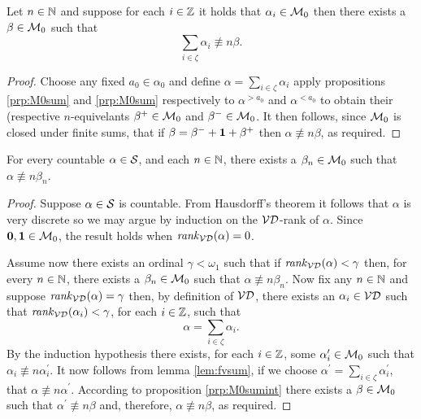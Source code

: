 \begin{prp}\label{prp:M0sumint}
	Let $n\in\mathbb{N}$ and suppose for each $i\in\mathbb{Z}$ it holds that $\alpha_i\in\mathcal{M}_0$ then there exists a $\beta\in\mathcal{M}_0$ such that
	\begin{equation}
		\sum_{i\in\zeta}\alpha_i\nequiv{n}\beta.
	\end{equation}
\end{prp}
\begin{proof}
	Choose any fixed $a_0\in\alpha_0$ and define $\alpha=\sum_{i\in\zeta}\alpha_i$ apply propositions \ref{prp:M0sum} and \ref{prp:M0sum} respectively to $\alpha^{>a_0}$ and $\alpha^{<a_0}$ to obtain their (respective $n$-equivelants $\beta^+\in\mathcal{M}_0$ and $\beta^-\in\mathcal{M}_0$.  It then follows, since $\mathcal{M}_0$ is closed under finite sums, that if $\beta=\beta^-+\mathbf{1}+\beta^+$ then $\alpha\nequiv{n}\beta$, as required.
\end{proof}

\begin{thm}
	For every countable $\alpha\in\mathcal{S}$, and each $n\in\mathbb{N}$, there exists a $\beta_n\in\mathcal{M}_0$ such that $\alpha\nequiv{n}\beta_n$.
\end{thm}
\begin{proof}
	Suppose $\alpha\in\mathcal{S}$ is countable.  From Hausdorff's theorem it follows that $\alpha$ is very discrete so we may argue by induction on the $\mathcal{VD}$-rank of $\alpha$. Since $\mathbf{0},\mathbf{1}\in\mathcal{M}_0$, the result holds when $\mathit{rank}_\mathcal{VD}(\alpha)=0$.

	Assume now there exists an ordinal $\gamma<\omega_1$ such that if $\mathit{rank}_\mathcal{VD}(\alpha)<\gamma$ then, for every $n\in\mathbb{N}$, there exists a $\beta_n\in\mathcal{M}_0$ such that $\alpha\nequiv{n}\beta_n$.  Now fix any $n\in\mathbb{N}$ and  suppose $\mathit{rank}_\mathcal{VD}(\alpha)=\gamma$ then, by definition of $\mathcal{VD}$, there exists an $\alpha_i\in\mathcal{VD}$ such that $\mathit{rank}_\mathcal{VD}(\alpha_i)<\gamma$, for each $i\in\mathbb{Z}$, such that
	\begin{equation}
		\alpha=\sum_{i\in\zeta}\alpha_i.
	\end{equation}
	By the induction hypothesis there exists, for each $i\in\mathbb{Z}$, some $\alpha^\prime_i\in\mathcal{M}_0$ such that $\alpha_i\nequiv{n}\alpha_i^\prime$.  It now follows from lemma \ref{lem:fvsum}, if we choose $\alpha^\prime=\sum_{i\in\zeta}\alpha_i^\prime$, that $\alpha\nequiv{n}\alpha^\prime$.  According to proposition \ref{prp:M0sumint} there exists a $\beta\in\mathcal{M}_0$ such that $\alpha^\prime\nequiv{n}\beta$ and, therefore, $\alpha\nequiv{n}\beta$, as required.
\end{proof}

